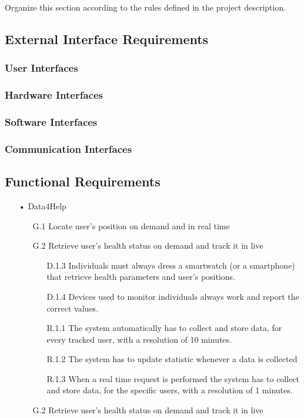 Organize this section according to the rules defined in the project description. 
\subsection{External Interface Requirements}
\subsubsection{User Interfaces}
\subsubsection{Hardware Interfaces}
\subsubsection{Software Interfaces}
\subsubsection{Communication Interfaces}


\subsection{Functional Requirements}
\begin{enumerate}
\item[•]{\Large Data4Help}
	\begin{enumerate}
	\item [G.1] Locate user's position on demand and in real time
	\item [G.2] Retrieve user's health status on demand and track it in live
		\begin{enumerate}
		\item [D.1.3] Individuals must always dress a smartwatch (or a smartphone) that retrieve health parameters and user's positions.
		\item [D.1.4] Devices used to monitor individuals always work and report 			the correct values.	
		\item [R.1.1] The system automatically has to collect and store data, for every tracked user, with a resolution of 10 minutes.
    	\item [R.1.2] The system has to update statistic whenever a data is collected
    	\item [R.1.3] When a real time request is performed the system has to collect and store data, for the specific users, with a resolution of 1 minutes.
		\end{enumerate}		
	\item [G.2] Retrieve user's health status on demand and track it in live
	\end{enumerate}

\end{enumerate}




